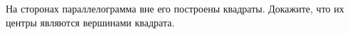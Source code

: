 \begin{ex}
	\begin{condition}
		На сторонах параллелограмма вне его построены квадраты. Докажите, что их центры являются вершинами квадрата.
	\end{condition}
\end{ex}